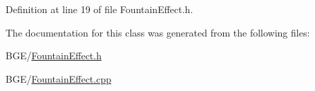 Definition at line 19 of file Fountain\-Effect.\-h.



The documentation for this class was generated from the following files\-:\begin{DoxyCompactItemize}
\item 
B\-G\-E/\hyperlink{_fountain_effect_8h}{Fountain\-Effect.\-h}\item 
B\-G\-E/\hyperlink{_fountain_effect_8cpp}{Fountain\-Effect.\-cpp}\end{DoxyCompactItemize}
